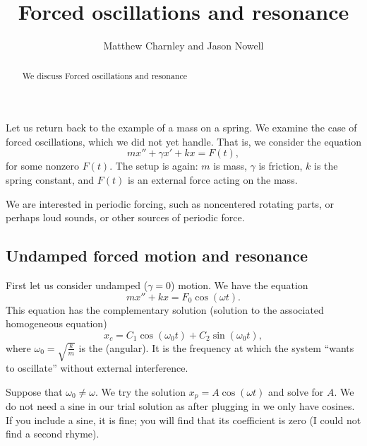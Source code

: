 \documentclass{ximera}
\title{Forced oscillations and resonance}
\author{Matthew Charnley and Jason Nowell}
\begin{document}
\begin{abstract}
    We discuss Forced oscillations and resonance
\end{abstract}
\maketitle

\label{forcedo:section}


\begin{mywrapfigsimp}{2.0in}{2.3in}
    \noindent
    
\end{mywrapfigsimp}
Let us return back to the example of a mass on a spring.  We examine the case of forced oscillations, which we did not yet handle.  That is, we consider the equation
\begin{equation*}
    mx'' + \gamma x' + kx = F(t) ,
\end{equation*}
for some nonzero $F(t)$.  The setup is again: $m$ is mass, $\gamma$ is friction, $k$ is the spring constant, and $F(t)$ is an external force acting on the mass.

We are interested in periodic forcing, such as noncentered rotating parts, or perhaps loud sounds, or other sources of periodic force.  

\subsection{Undamped forced motion and resonance}

First let us consider undamped ($\gamma =0$) motion. We have the equation
\begin{equation*}
    mx'' + kx = F_0 \cos (\omega t) .
\end{equation*}
This equation has the complementary solution (solution to the associated homogeneous equation)
\begin{equation*}
    x_c = C_1 \cos (\omega_0 t) + C_2 \sin (\omega_0 t) ,
\end{equation*}
where $\omega_0 = \sqrt{\frac{k}{m}}$ is the \emph{} (angular).  It is the frequency at which the system ``wants to oscillate'' without external interference.

Suppose that $\omega_0 \not= \omega$.  We try the solution $x_p = A \cos (\omega t)$ and solve for $A$.  We do not need a sine in our trial solution as after plugging in we only have cosines. If you include a sine, it is fine; you will find that its coefficient is zero (I could not find a second rhyme).
\end{document}
